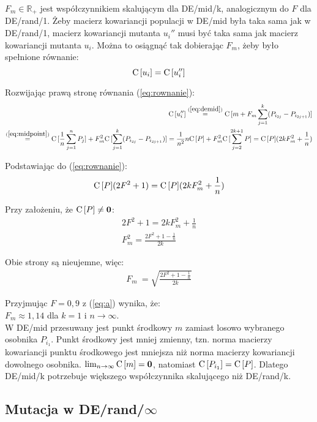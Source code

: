 \documentclass[12pt, a4paper]{article}
\def\C{{\rm C}\,}
\begin{document}
$F_m\in\mathbb{R_+}$ jest współczynnikiem skalującym dla DE/mid/k, analogicznym do $F$ dla DE/rand/1. 
Żeby macierz kowariancji populacji w DE/mid była taka sama jak w DE/rand/1, 
macierz kowariancji mutanta $u_i''$ musi być taka sama jak macierz kowariancji mutanta $u_i$.
Można to osiągnąć tak dobierając $F_m$, żeby było spełnione równanie:
\begin{equation} \label{eq:rownanie}
\C[u_i] = \C[u_i'']
\end{equation}

Rozwijając prawą stronę równania (\ref{eq:rownanie}):
\begin{align*}
\C[u_i''] \overset{(\ref{eq:demid})}{=} \C[m + F_m\sum\limits_{j=1}^k (P_{i_{2j}} - P_{i_{2j+1}})] \\
\overset{(\ref{eq:midpoint})}{=} \C[\frac{1}{n}\sum\limits_{j=1}^n P_j] + F_m^2\C[\sum\limits_{j=1}^k (P_{i_{2j}} - P_{i_{2j+1}})] 
= \frac{1}{n^2}n\C[P] + F_m^2\C[\sum\limits_{j=2}^{2k+1} P] = \C[P](2kF_m^2 + \frac{1}{n})
\end{align*}

Podstawiając do (\ref{eq:rownanie}):
\begin{align*}
\C[P](2F^2 + 1) = \C[P](2kF_m^2 + \frac{1}{n})
\end{align*}

Przy założeniu, że $\C[P] \neq \textbf{0}$:
\begin{align*}
2F^2 + 1 = 2kF_m^2 + \frac{1}{n} \\
F_m^2 = \frac{2F^2 + 1 - \frac{1}{n}}{2k}
\end{align*}

Obie strony są nieujemne, więc:
\begin{align} \label{eq:a}
F_m\ = \sqrt{\frac{2F^2 + 1 - \frac{1}{n}}{2k}}
\end{align}

Przyjmując $F=0,9$ z (\ref{eq:a}) wynika, że: \\
$F_m \approx 1,14$ dla $k=1$ i $n\to\infty$. \\

W DE/mid przesuwany jest punkt środkowy $m$ zamiast losowo wybranego osobnika $P_{i_1}$.
Punkt środkowy jest mniej zmienny, 
tzn. norma macierzy kowariancji punktu środkowego jest mniejsza niż norma macierzy kowariancji dowolnego osobnika.
$\lim_{n\to\infty} \C[m] = \textbf{0}$, natomiast $\C[P_{i_1}] = \C[P]$.
Dlatego DE/mid/k potrzebuje większego współczynnika skalującego niż DE/rand/k. \\

\subsection{Mutacja w DE/rand/$\infty$}
\end{document}
